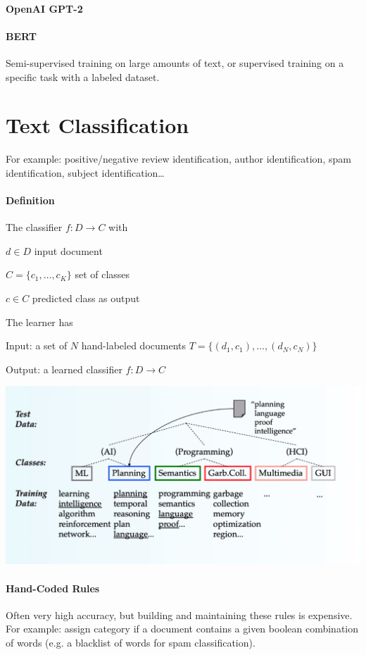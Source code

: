 \documentclass[10pt]{report}
\begin{document}
\paragraph{OpenAI GPT-2}
\paragraph{BERT} Semi-supervised training on large amounts of text, or supervised training on a specific task with a labeled dataset.
\section{Text Classification}
For example: positive/negative review identification, author identification, spam identification, subject identification\ldots
\paragraph{Definition} The classifier $f : D \rightarrow C$ with
\begin{list}{}{}
	\item $d\in D$ input document
	\item $C=\{c_1,\ldots,c_K\}$ set of classes
	\item $c\in C$ predicted class as output
\end{list}
The learner has
\begin{list}{}{}
	\item Input: a set of $N$ hand-labeled documents $T=\{(d_1,c_1),\ldots,(d_N,c_N)\}$
	\item Output: a learned classifier $f:D\rightarrow C$
\end{list}
\begin{center}
	\includegraphics[scale=0.5]{9.png}
\end{center}
\paragraph{Hand-Coded Rules} Often very high accuracy, but building and maintaining these rules is expensive. For example: assign category if a document contains a given boolean combination of words (e.g. a blacklist of words for spam classification).
\end{document}
